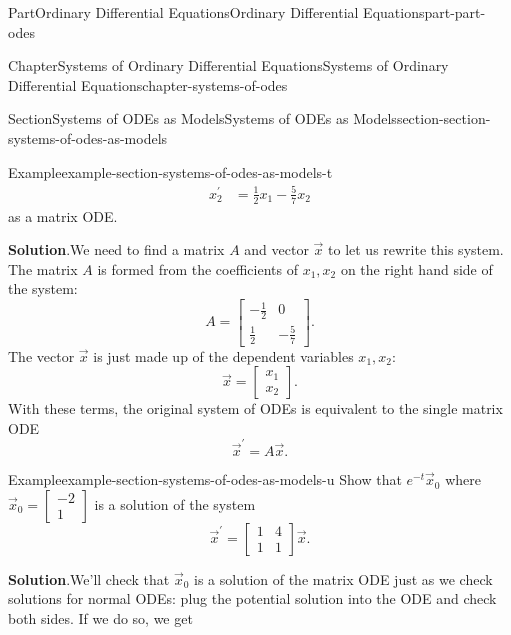 \documentclass[twoside,10pt,]{book}
\newcommand{\blocktitlefont}{\relax}
\numberwithin{equation}{part}
\begin{document}
\begin{partptx}{Part}{Ordinary Differential Equations}{}{Ordinary Differential Equations}{}{}{part-part-odes}
\begin{chapterptx}{Chapter}{Systems of Ordinary Differential Equations}{}{Systems of Ordinary Differential Equations}{}{}{chapter-systems-of-odes}
\begin{sectionptx}{Section}{Systems of ODEs as Models}{}{Systems of ODEs as Models}{}{}{section-section-systems-of-odes-as-models}
\begin{example}{Example}{}{example-section-systems-of-odes-as-models-t}
\begin{align*}
x^\prime_{2}  & = \frac{1}{2}x_{1}-\frac{5}{7}x_{2}
\end{align*}
as a matrix ODE.%
\par\smallskip%
\noindent\textbf{\blocktitlefont Solution}.\hypertarget{solution-section-systems-of-odes-as-models-t-b}{}\quad{}We need to find a matrix \(A\) and vector \(\vec{x}\) to let us rewrite this system. The matrix \(A\) is formed from the coefficients of \(x_{1},x_{2}\) on the right hand side of the system:%
\begin{equation*}
A = \begin{bmatrix}-\frac{1}{2}& 0\\\frac{1}{2}& -\frac{5}{7}\end{bmatrix}.
\end{equation*}
The vector \(\vec{x}\) is just made up of the dependent variables \(x_{1},x_{2}\):%
\begin{equation*}
\vec{x} = \begin{bmatrix}x_{1}\\x_{2}\end{bmatrix}.
\end{equation*}
With these terms, the original system of ODEs is equivalent to the single matrix ODE%
\begin{equation*}
\vec{x}^\prime = A\vec{x}.
\end{equation*}
%
\end{example}
\begin{example}{Example}{}{example-section-systems-of-odes-as-models-u}%
Show that \(e^{-t}\vec{x}_{0}\) where \(\vec{x}_{0} = \begin{bmatrix}-2\\1\end{bmatrix}\) is a solution of the system%
\begin{equation*}
\vec{x}^\prime = \begin{bmatrix}1& 4\\1& 1\end{bmatrix}\vec{x}.
\end{equation*}
%
\par\smallskip%
\noindent\textbf{\blocktitlefont Solution}.\hypertarget{solution-section-systems-of-odes-as-models-u-b}{}\quad{}We'll check that \(\vec{x}_{0}\) is a solution of the matrix ODE just as we check solutions for normal ODEs: plug the potential solution into the ODE and check both sides. If we do so, we get%
\begin{equation*}

\end{equation*}
\end{example}
\end{sectionptx}
\end{chapterptx}
\end{partptx}
\end{document}
